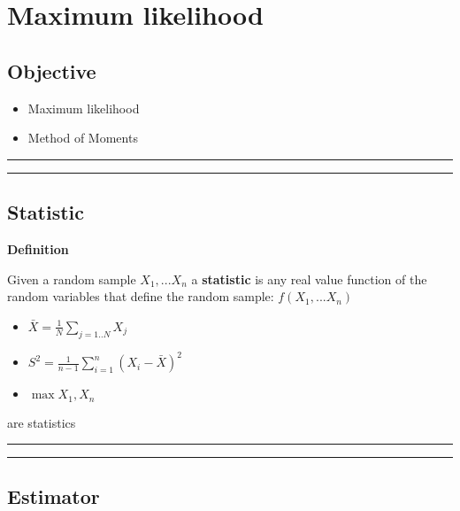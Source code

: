 \documentclass[
]{book}
\providecommand{\tightlist}{%
  \setlength{\itemsep}{0pt}\setlength{\parskip}{0pt}}
\begin{document}
\hypertarget{maximum-likelihood}{%
\chapter{Maximum likelihood}\label{maximum-likelihood}}

\hypertarget{objective-11}{%
\section{Objective}\label{objective-11}}

\begin{itemize}
\tightlist
\item
  Maximum likelihood
\item
  Method of Moments
\end{itemize}

\begin{center}\rule{0.5\linewidth}{0.5pt}\end{center}

\begin{center}\rule{0.5\linewidth}{0.5pt}\end{center}

\hypertarget{statistic-1}{%
\section{Statistic}\label{statistic-1}}

\textbf{Definition}

Given a random sample \(X_1,...X_n\) a \textbf{statistic} is any real value function of the random variables that define the random sample: \(f(X_1,...X_n)\)

\begin{itemize}
\tightlist
\item
  \(\bar{X}=\frac{1}{N} \sum_{j=1..N} X_j\)
\item
  \(S^2=\frac{1}{n-1}\sum_{i=1}^n (X_i-\bar{X})^2\)
\item
  \(\max{X_1, X_n}\)
\end{itemize}

are statistics

\begin{center}\rule{0.5\linewidth}{0.5pt}\end{center}

\begin{center}\rule{0.5\linewidth}{0.5pt}\end{center}

\hypertarget{estimator}{%
\section{Estimator}\label{estimator}}
\end{document}
